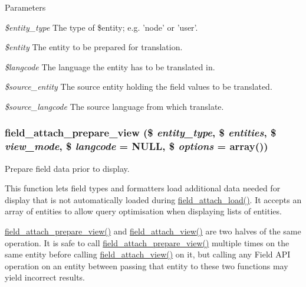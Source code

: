 \begin{DoxyParams}{Parameters}
\item[{\em \$entity\_\-type}]The type of \$entity; e.g. 'node' or 'user'. \item[{\em \$entity}]The entity to be prepared for translation. \item[{\em \$langcode}]The language the entity has to be translated in. \item[{\em \$source\_\-entity}]The source entity holding the field values to be translated. \item[{\em \$source\_\-langcode}]The source language from which translate. \end{DoxyParams}
\hypertarget{group__field__attach_ga12b5fce5e2b2adb487c485c63bfe0298}{
\subsubsection[{field\_\-attach\_\-prepare\_\-view}]{\setlength{\rightskip}{0pt plus 5cm}field\_\-attach\_\-prepare\_\-view (\$ {\em entity\_\-type}, \/  \$ {\em entities}, \/  \$ {\em view\_\-mode}, \/  \$ {\em langcode} = {\ttfamily NULL}, \/  \$ {\em options} = {\ttfamily array()})}}
\label{group__field__attach_ga12b5fce5e2b2adb487c485c63bfe0298}
Prepare field data prior to display.

This function lets field types and formatters load additional data needed for display that is not automatically loaded during \hyperlink{group__field__attach_ga1e92543395961c912eb293b50e991586}{field\_\-attach\_\-load()}. It accepts an array of entities to allow query optimisation when displaying lists of entities.

\hyperlink{group__field__attach_ga12b5fce5e2b2adb487c485c63bfe0298}{field\_\-attach\_\-prepare\_\-view()} and \hyperlink{group__field__attach_gaa752a8fd31173fd2308d71eb059e00c7}{field\_\-attach\_\-view()} are two halves of the same operation. It is safe to call \hyperlink{group__field__attach_ga12b5fce5e2b2adb487c485c63bfe0298}{field\_\-attach\_\-prepare\_\-view()} multiple times on the same entity before calling \hyperlink{group__field__attach_gaa752a8fd31173fd2308d71eb059e00c7}{field\_\-attach\_\-view()} on it, but calling any Field API operation on an entity between passing that entity to these two functions may yield incorrect results.


